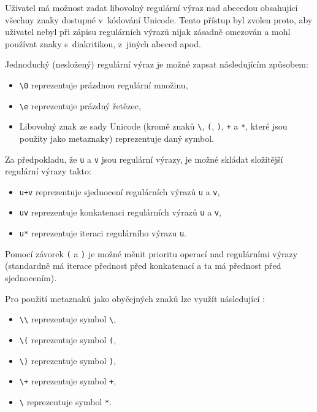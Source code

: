 \documentclass[10pt, notitlepage]{article}
\begin{document}
Uživatel má možnost zadat libovolný regulární výraz nad abecedou obsahující
všechny znaky dostupné v~kódování Unicode. Tento přístup byl zvolen proto, aby
uživatel nebyl při zápisu regulárních výrazů nijak zásadně omezován a mohl
používat znaky s~diakritikou, z~jiných abeced apod.

Jednoduchý (nesložený) regulární výraz je možné zapsat následujícím způsobem:

\begin{itemize}
	\item \texttt{\textbackslash 0} reprezentuje prázdnou regulární množinu,

	\item \texttt{\textbackslash e} reprezentuje prázdný řetězec,

	\item Libovolný znak ze sady Unicode (kromě znaků \texttt{\textbackslash},
	\texttt{(}, \texttt{)}, \texttt{+} a \texttt{*}, které jsou použity jako
	metaznaky) reprezentuje daný symbol.
\end{itemize}

Za předpokladu, že \texttt{u} a \texttt{v} jsou regulární výrazy, je možné
skládat složitější regulární výrazy takto:

\begin{itemize}
	\item \texttt{u+v} reprezentuje sjednocení regulárních výrazů \texttt{u} a
		\texttt{v},

	\item \texttt{uv} reprezentuje konkatenaci regulárních výrazů \texttt{u} a
		\texttt{v},

	\item \texttt{u*} reprezentuje iteraci regulárního výrazu \texttt{u}.
\end{itemize}

Pomocí závorek \texttt{(} a \texttt{)} je možné měnit prioritu operací nad
regulárními výrazy (standardně má iterace přednost před konkatenací a ta má
přednost před sjednocením).

Pro použití metaznaků jako obyčejných znaků lze využít následující :

\begin{itemize}

	\item \texttt{\textbackslash \textbackslash} reprezentuje symbol
		\texttt{\textbackslash},

	\item \texttt{\textbackslash (} reprezentuje symbol \texttt{(},

	\item \texttt{\textbackslash )} reprezentuje symbol \texttt{)},

	\item \texttt{\textbackslash +} reprezentuje symbol \texttt{+},

	\item \texttt{\textbackslash *} reprezentuje symbol \texttt{*}.
\end{itemize}
\end{document}
